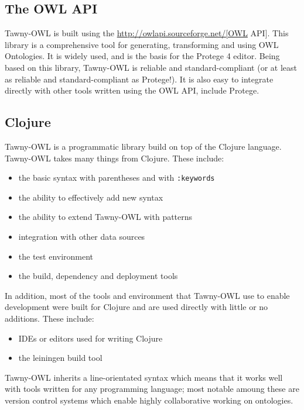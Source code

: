 \subsection{The OWL API}
\label{sec:owl-api}

Tawny-OWL is built using the \url{http://owlapi.sourceforge.net/[OWL} API].
This library is a comprehensive tool for generating, transforming and using
OWL Ontologies. It is widely used, and is the basis for the Protege 4
editor\cite{greycite2912}. Being based on this library, Tawny-OWL is reliable
and standard-compliant (or at least as reliable and standard-compliant as
Protege!). It is also easy to integrate directly with other tools written
using the OWL API, include Protege.

\subsection{Clojure}
\label{sec:clojure}

Tawny-OWL is a programmatic library build on top of the Clojure
language. Tawny-OWL takes many things from Clojure. These include:

\begin{itemize}
\item the basic syntax with parentheses and with \texttt{:keywords}
\item the ability to effectively add new syntax
\item the ability to extend Tawny-OWL with patterns
\item integration with other data sources
\item the test environment
\item the build, dependency and deployment tools
\end{itemize}

In addition, most of the tools and environment that Tawny-OWL use to
enable development were built for Clojure and are used directly with
little or no additions. These include:

\begin{itemize}
\item IDEs or editors used for writing Clojure
\item the leiningen build tool
\end{itemize}

Tawny-OWL inherits a line-orientated syntax which means that it works
well with tools written for any programming language; most notable
amoung these are version control systems which enable highly
collaborative working on ontologies.

